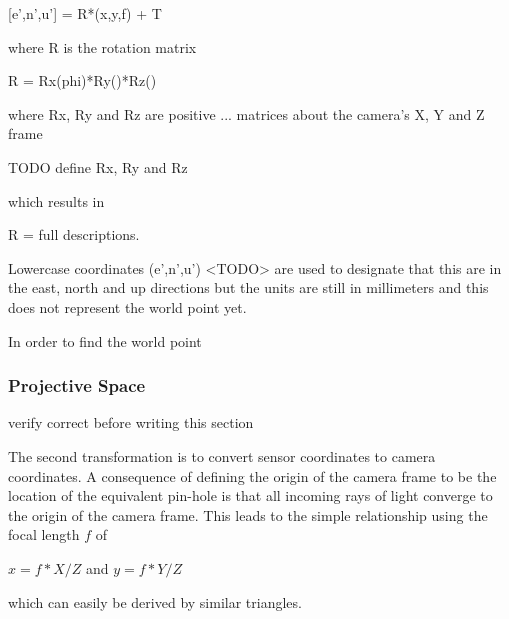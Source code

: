  [e',n',u'] = R*(x,y,f) + T
 
 where R is the rotation matrix
 
  R = Rx(phi)*Ry()*Rz()
  
  where Rx, Ry and Rz are positive ... matrices about the camera's X, Y and Z frame
  
  TODO define Rx, Ry and Rz
  
  which results in 
  
  R = full descriptions. 
  
  
  
    
 
 Lowercase coordinates (e',n',u') <TODO> are used to designate that this are in the east, north and up directions but the units are still in millimeters and this does not represent the world point yet.
 
 In order to find the world point 
 
 

 \subsubsection{Projective Space}
 
 verify correct before writing this section
 
 The second transformation is to convert sensor coordinates to camera coordinates.  A consequence of defining the origin of the camera frame to be the location of the equivalent pin-hole is that all incoming rays of light converge to the origin of the camera frame.  This leads to the simple relationship using the focal length $f$ of
  
  $x=f*X/Z$  and $y=f*Y/Z$
 
  which can easily be derived by similar triangles.